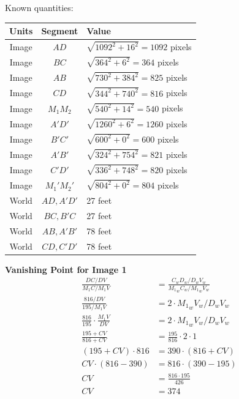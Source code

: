 \documentclass[12pt, oneside]{article}
\begin{document}
Known quantities:
\begin{table}[H]
\centering
\begin{tabular}{|c|c|l|}
\hline
\multicolumn{1}{|l|}{\textbf{Units}} & \textbf{Segment} & \textbf{Value}  \\ \hline
Image & $AD$      & $\sqrt{1092^2 + 16^2} = 1092$ pixels     \\ \hline
Image & $BC$      & $\sqrt{364^2 + 6^2} = 364$ pixels       \\ \hline
Image & $AB$      & $\sqrt{730^2 + 384^2} = 825$ pixels     \\ \hline
Image & $CD$      & $\sqrt{344^2 + 740^2} = 816$ pixels     \\ \hline
Image & $M_1 M_2$ & $\sqrt{540^2 + 14^2} = 540$ pixels     \\ \hline
Image & $A'D'$      & $\sqrt{1260^2 + 6^2} = 1260$ pixels     \\ \hline
Image & $B'C'$      & $\sqrt{600^2 + 0^2} = 600$ pixels       \\ \hline
Image & $A'B'$      & $\sqrt{324^2 + 754^2} = 821$ pixels     \\ \hline
Image & $C'D'$      & $\sqrt{336^2 + 748^2} = 820$ pixels     \\ \hline
Image & $M_1' M_2'$ & $\sqrt{804^2 + 0^2} = 804$ pixels     \\ \hline
World & $AD, A'D'$      & 27 feet     \\ \hline
World & $BC, B'C$       & 27 feet     \\ \hline
World & $AB, A'B'$      & 78 feet     \\ \hline
World & $CD, C'D'$      & 78 feet     \\ \hline
\end{tabular}
\end{table}

\textbf{Vanishing Point for Image 1}
\begin{align*}
  \frac{DC/DV}{{M_1}C/M_1V} &= \frac{C_wD_w/D_wV_w}{{M_1}_wC_w/{M_1}_wV_w} \\
  \frac{816/DV}{195/M_1V}                 &= 2 \cdot {M_1}_wV_w/D_wV_w \\
  \frac{816}{195}\cdot \frac{M_1V}{DV}    &= 2 \cdot {M_1}_wV_w/D_wV_w \\
  \frac{195 + CV}{816 + CV}   &= \frac{195}{816}\cdot 2 \cdot 1 \\
  (195 + CV) \cdot 816   &= 390 \cdot (816 + CV) \\
  CV \cdot (816 - 390)   &= 816 \cdot (390 - 195)\\
  CV  &= \frac{816 \cdot 195} {426}\\
  CV  &= 374\\
\end{align*}
\end{document}
